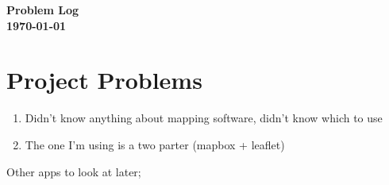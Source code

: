 \documentclass[a4paper,twoside,notitlepage,11pt]{article}
\begin{document}
\pagestyle{empty}
\begin{center}
 {\LARGE \textbf{Problem Log} \\ [0.2cm]}
	 \textbf{\today}
\end{center}

\section{Project Problems}
\begin{enumerate}
\item Didn't know anything about mapping software, didn't know which to use
\item The one I'm using is a two parter (mapbox + leaflet)
\end{enumerate}


{\color{red} 
Other apps to look at later;\ \\
\ \\
}
\end{document}
